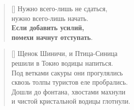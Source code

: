 \documentclass[a5paper,11pt]{memoir}
\begin{document}
\begin{verse}[\versewidth]
Нужно всего-лишь не сдаться, \\
нужно всего-лишь начать. \\
\textbf{Если добавить усилий, \\
помехи начнут отступать}.
\end{verse}

\BgThispage

\newpage

\PlainPoemTitle
{}
\settowidth{\versewidth}{ступеньки под весом скрипят и трещат ---}
\begin{verse}[\versewidth]
Щенок Шиничи, и Птица-Синица\\
решили в Токио водицы напиться.\\
Под ветками сакуры они прогулялись\\
сквозь толпы туристов еле пробрались.\\
Дошли до фонтана, хвостами махнули\\
и чистой кристальной водицы глотнули.\\
\end{verse}
\end{document}
